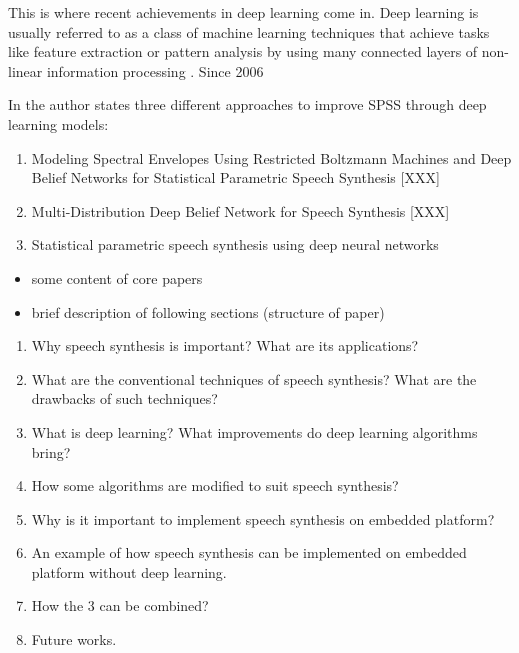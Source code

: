This is where recent achievements in deep learning come in. Deep learning is usually referred to as a class of machine learning techniques that achieve tasks like feature extraction or pattern analysis by using many connected layers of non-linear information processing \cite{ling:deep, li:survey}. Since 2006 

In \cite{li:survey} the author states three different approaches to improve \ac{SPSS} through deep learning models: 

\vspace{1em}

\begin{enumerate}
	\parskip0.5em
	\item Modeling Spectral Envelopes Using Restricted Boltzmann Machines and Deep Belief Networks for Statistical Parametric Speech Synthesis [XXX]
	\item Multi-Distribution Deep Belief Network for Speech Synthesis [XXX]
	\item Statistical parametric speech synthesis using deep neural networks \cite{zen:deepstatistical}
\end{enumerate}

\vspace{1em}

\begin{itemize}
	\item some content of core papers
	\item brief description of following sections (structure of paper)
\end{itemize}

\clearpage

\begin{enumerate}[leftmargin=16pt]
	\item Why speech synthesis is important? What are its applications?
	\item What are the conventional techniques of speech synthesis? What are the drawbacks of such techniques?
	\item What is deep learning? What improvements do deep learning algorithms bring?
	\item How some algorithms are modified to suit speech synthesis?
	\item Why is it important to implement speech synthesis on embedded platform?
	\item An example of how speech synthesis can be implemented on embedded platform without deep learning.
	\item How the 3 can be combined?
	\item Future works.
\end{enumerate}

